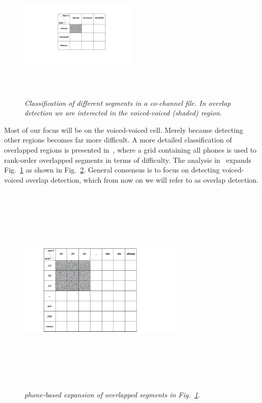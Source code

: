 \begin{figure}[h!]
	\centering
	\includegraphics[height = 2.5in, width=0.5\textwidth]{figures/morgan_v_uv_table}
	\caption{\it Classification of different segments in a co-channel file. In overlap detection we are interected in 
		the voiced-voiced (shaded) region.}
	\label{fig:morgan_v_uv_table}
\end{figure}

Most of our focus will be on the voiced-voiced cell. 
Merely because detecting other regions becomes far more difficult. 
A more detailed classification of overlapped regions is presented in~\cite{nav_icassp13}, where a grid containing all phones is used to rank-order overlapped segments in terms of difficulty. 
The analysis in~\cite{nav_icassp13} expands Fig.~\ref{fig:morgan_v_uv_table} as shown in Fig.~\ref{fig:nav_v_uv_table}. 
General consensus is to focus on detecting voiced-voiced overlap detection, which from now on we will refer to as overlap detection. 

\begin{figure}[h!]
	\centering
	\includegraphics[height = 4in, width=0.7\textwidth]{figures/nav_v_uv_table}	
	\caption{\it phone-based expansion of overlapped segments in Fig.~\ref{fig:morgan_v_uv_table}.}
	\label{fig:nav_v_uv_table}
\end{figure}

